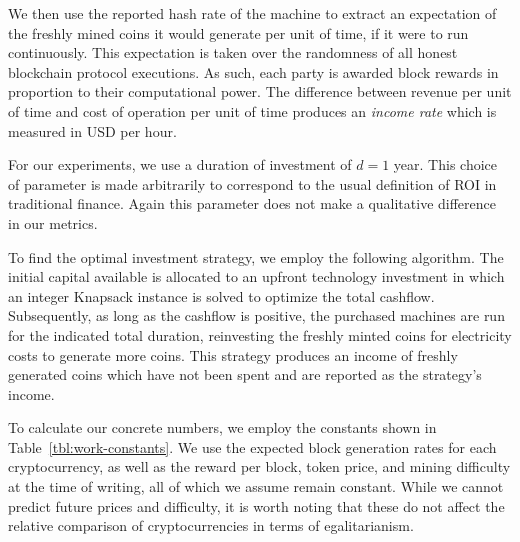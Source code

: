 
We then use the reported hash rate of the machine to extract an expectation of
the freshly mined coins it would generate per unit of time, if it were to run
continuously. This expectation is taken over the randomness of all honest
blockchain protocol executions. As such, each party is awarded block rewards in
proportion to their computational power. The difference between revenue per unit
of time and cost of operation per unit of time produces an \emph{income rate}
which is measured in USD per hour.

For our experiments, we use a duration of investment of $d = 1$
year. This choice of parameter is made arbitrarily to correspond to the usual
definition of ROI in traditional finance. Again this parameter does not make a
qualitative difference in our metrics.


To find the optimal investment strategy, we employ the following algorithm. The
initial capital available is allocated to an upfront technology investment in
which an integer Knapsack instance is solved to optimize the total cashflow.
Subsequently, as long as the cashflow is positive, the purchased machines are
run for the indicated total duration, reinvesting the freshly minted coins for
electricity costs to generate more coins. This strategy produces an income of
freshly generated coins which have not been spent and are reported as the
strategy's income.

To calculate our concrete numbers, we employ the constants shown in
Table~\ref{tbl:work-constants}. We use the expected block generation rates
for each cryptocurrency, as well as the reward per block, token price, and
mining difficulty at the time of writing, all of which we assume remain
constant. While we cannot predict future prices and difficulty, it is worth
noting that these do not affect the relative comparison of cryptocurrencies in
terms of egalitarianism.

